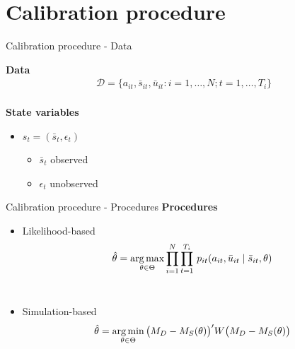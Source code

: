 \section{Calibration procedure}
\begin{frame}{Calibration procedure - Data}

\textbf{Data}\vspace{0.3cm}\\
\begin{align*}
	\mathcal{D} = \{a_{it}, \bar{s}_{it}, \bar{u}_{it}: i = 1, \hdots, N; t = 1, \hdots, T_i\}\\
\end{align*}

\textbf{State variables}\vspace{0.3cm}
\begin{itemize}\setlength\itemsep{1em}
\item $s_t = (\bar{s}_t, \epsilon_t)$\medskip
\begin{itemize}\setlength\itemsep{1em}
	\item $\bar{s}_t$ observed
	\item $\epsilon_t$ unobserved
\end{itemize}
\end{itemize}
\end{frame}
\begin{frame}{Calibration procedure - Procedures}
\textbf{Procedures}\vspace{0.5cm}\\
\begin{itemize}\setlength\itemsep{1em}
\item Likelihood-based\\\vspace{0.5cm}
\begin{align*}
  \hat{\theta} = \argmax_{\theta \in \Theta} \prod^N_{i= 1} \prod^{T_i}_{t= 1}\, p_{it}(a_{it}, \bar{u}_{it} \mid \bar{s}_{it}, \theta)
\end{align*}\\
\item Simulation-based\\\vspace{0.5cm}
\begin{align*}
    \hat{\theta} = \argmin_{\theta \in \Theta} \big(M_D - M_S(\theta)\big)' W \big(M_D - M_S(\theta)\big)
\end{align*}
\end{itemize}
\end{frame}
